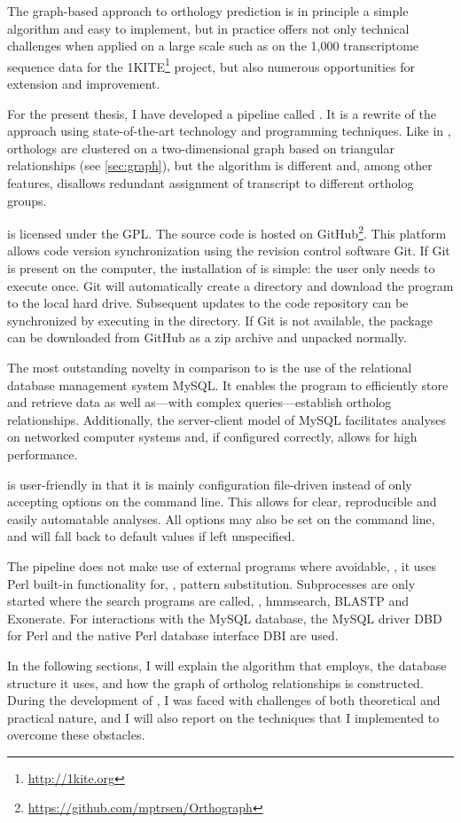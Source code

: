 The graph-based approach to orthology prediction is in principle a simple
algorithm and easy to implement, but in practice offers not only technical
challenges when applied on a large scale such as on the 1,000 transcriptome
sequence data for the 1KITE\footnote{\url{http://1kite.org}} project, but also
numerous opportunities for extension and improvement. 

For the present thesis, I have developed a pipeline called \pname.
It is a rewrite of the \hamstr approach using state-of-the-art technology and
programming techniques. Like in \hamstr, orthologs are clustered on a
two-dimensional graph based on triangular relationships (see
\autoref{sec:graph}), but the algorithm is different and, among other features,
disallows redundant assignment of transcript to different ortholog groups.

\pname is licensed under the GPL. The source code is hosted on
GitHub\footnote{\url{https://github.com/mptrsen/Orthograph}}. This platform
allows code version synchronization using the revision control software Git. If
Git is present on the computer, the installation of \pname is simple: the user
only needs to execute 
once. Git will automatically create a directory and download the program to the
local hard drive. Subsequent updates to the code repository can be synchronized
by executing  in the \pname directory. If Git is not available,
the package can be downloaded from GitHub as a zip archive and unpacked
normally.

The most outstanding novelty in comparison to \hamstr is the use of the
relational database management system MySQL. It enables the program to
efficiently store and retrieve data as well as---with complex 
queries---establish ortholog relationships. Additionally, the server-client
model of MySQL facilitates analyses on networked computer systems and, if
configured correctly, allows for high performance.

\pname is user-friendly in that it is mainly configuration file-driven instead
of only accepting options on the command line. This allows for clear,
reproducible and easily automatable analyses. All options may also be set on the
command line, and will fall back to default values if left unspecified.

The pipeline does not make use of external programs where avoidable, \ie, it
uses Perl built-in functionality for, \eg, pattern substitution. Subprocesses
are only started where the search programs are called, \ie, hmmsearch, BLASTP
and Exonerate. For interactions with the MySQL database, the MySQL driver DBD
for Perl and the native Perl database interface DBI are used.

In the following sections, I will explain the algorithm that \pname employs, the
database structure it uses, and how the graph of ortholog relationships is
constructed. During the development of \pname, I was faced with challenges of
both theoretical and practical nature, and I will also report on the techniques
that I implemented to overcome these obstacles.

